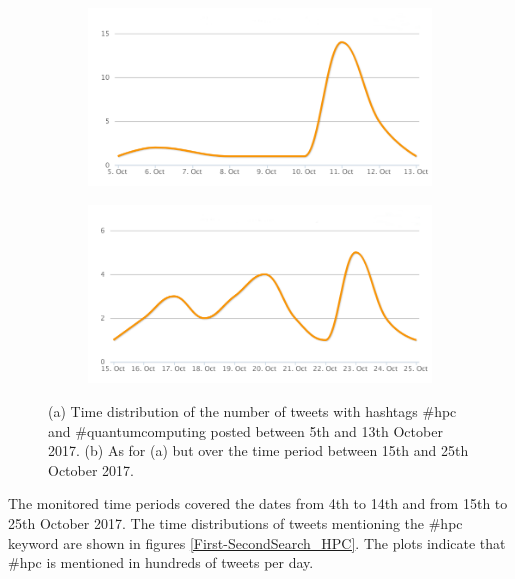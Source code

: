 \begin{figure}
 \centering
 \begin{subfigure}[b]{0.9\textwidth}
   \includegraphics[width=1\linewidth]{Images/FirstSearch_HPC-QuantumComputing.png}
   \caption{} 
 \end{subfigure}

 \begin{subfigure}[b]{0.9\textwidth}
   \includegraphics[width=1\linewidth]{Images/SecondSearch_HPC-QuantumComputing.png}
   \caption{}
 \end{subfigure}
 \caption{(a) Time distribution of the number of tweets with hashtags \#hpc and \#quantumcomputing posted between 5th and 13th October 2017. (b) As for (a) but over the time period between 15th and 25th October 2017.} 
 \label{First-SecondSearch_HPC-QuantumComputing}
\end{figure}

The monitored time periods covered the dates from 4th to 14th and from 15th to 25th October 2017. The time distributions of tweets mentioning the \#hpc keyword are shown in figures \ref{First-SecondSearch_HPC}. The plots indicate that \#hpc is mentioned in hundreds of tweets per day.

